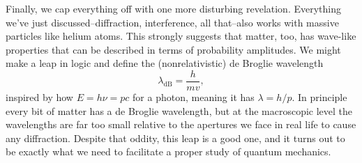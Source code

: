 \documentclass[../p051main.tex]{subfiles}
\begin{document}
Finally, we cap everything off with one more disturbing revelation.
Everything we've just discussed--diffraction, interference, all that--also works with massive particles like helium atoms.
This strongly suggests that matter, too, has wave-like properties that can be described in terms of probability amplitudes.
We might make a leap in logic and define the (nonrelativistic) de Broglie wavelength
\[ \lambda_\textrm{dB} = \frac{h}{mv}, \]
inspired by how $E = h\nu = pc$ for a photon, meaning it has $\lambda = h / p$.
In principle every bit of matter has a de Broglie wavelength, but at the macroscopic level the wavelengths are far too small relative to the apertures we face in real life to cause any diffraction.
Despite that oddity, this leap is a good one, and it turns out to be exactly what we need to facilitate a proper study of quantum mechanics.
\end{document}
